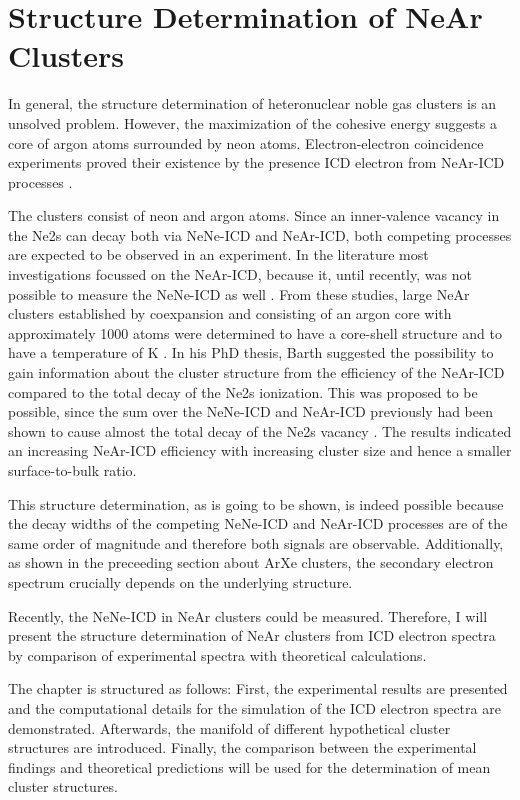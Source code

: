\section{Structure Determination of NeAr Clusters}
\label{section:NeArclusters}

In general, the structure determination of heteronuclear noble gas
clusters is an unsolved problem. However, the maximization of the cohesive
energy suggests a core of argon atoms surrounded by neon atoms.
Electron-electron coincidence experiments proved their existence by the
presence ICD electron from NeAr-ICD processes \cite{Lundwall07}.

The clusters consist of neon and argon atoms. Since an inner-valence vacancy in
the Ne2s can decay both via NeNe-ICD and NeAr-ICD, both competing processes
are expected to be observed in an experiment. In the literature most
investigations focussed on the NeAr-ICD, because it, until recently, was not
possible to measure the NeNe-ICD as well \cite{Fasshauer14_1}.
From these studies, large NeAr clusters established by coexpansion and
consisting of an argon core with
approximately 1000 atoms were determined to have a core-shell structure
\cite{Lundwall07,Barth_diss}
and to have a temperature of \unit[40 -- 50]{K} \cite{Barth_diss}.
In his PhD thesis, Barth suggested the possibility to gain information about
the cluster structure from the efficiency of the NeAr-ICD compared to the
total decay of the Ne2s ionization. This was proposed to be possible, since
the sum over the NeNe-ICD and NeAr-ICD previously had been shown to
cause almost the total decay of the Ne2s vacancy \cite{Marburger_diss}.
The results indicated an increasing NeAr-ICD efficiency with increasing
cluster size and hence a smaller surface-to-bulk ratio.

This structure determination, as is going to be shown, is indeed possible
because the decay widths of the competing NeNe-ICD and NeAr-ICD processes
are of the same order
of magnitude and therefore both signals are observable. Additionally, as shown
in the preceeding section about ArXe clusters, the secondary electron spectrum
crucially depends on the underlying structure.

Recently, the NeNe-ICD in NeAr clusters could be measured. Therefore, I will
present the structure determination of NeAr clusters from ICD electron
spectra by comparison of experimental spectra with theoretical calculations.

The chapter is structured as follows: First, the experimental results are
presented and the computational details for the simulation of the ICD
electron spectra are demonstrated. Afterwards, the manifold of different 
hypothetical cluster structures are introduced. Finally, the comparison
between the experimental findings and theoretical predictions will be used
for the determination of mean cluster structures.


